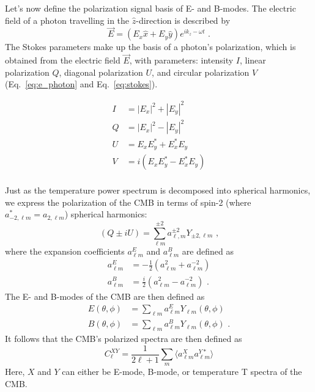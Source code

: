 Let's now define the polarization signal basis of E- and B-modes.  The electric field of a photon travelling in the $\hat{z}$-direction is described by
\begin{equation}
    \Vec{E} = (E_x\hat{x} + E_y\hat{y})e^{i k_z - \omega t } \text{ .}
    \label{eq:e_photon}
\end{equation}
The Stokes parameters make up the basis of a photon's polarization, which is obtained from the electric field $\Vec{E}$, with parameters: intensity $I$, linear polarization $Q$, diagonal polarization $U$, and circular polarization $V$ (Eq.~\ref{eq:e_photon} and Eq.~\ref{eq:stokes}).

\begin{equation}
\begin{split}
    I & = |E_x|^2 + |E_y|^2 \\
    Q & = |E_x|^2 - |E_y|^2 \\
    U & = E_x E_y^* + E_x^*E_y\\
    V & = i(E_x E_y^* - E_x^*E_y) \\
\end{split}
\label{eq:stokes}
\end{equation}

Just as the temperature power spectrum is decomposed into spherical harmonics, we express the polarization of the CMB in terms of spin-2 (where $a^*_{-2,\ell m} = a_{2,\ell m}$) spherical harmonics:
\begin{equation}
(Q \pm iU) = \sum_{\ell m}^{\pm 2} a^{\pm 2}_{\ell ,m} Y_{\pm2,\ell m} \text{ ,}
\end{equation}
where the expansion coefficients $a_{\ell m }^E$ and $a_{\ell m }^B$ are defined as
\begin{equation}
\begin{split}
    a_{\ell m }^E & = -\frac{1}{2}(a_{\ell m}^2 + a_{\ell m}^{-2}) \\
    a_{\ell m }^B & = \frac{i}{2}(a_{\ell m}^2 - a_{\ell m}^{-2}) \text{ .}
\end{split}
\end{equation}
The E- and B-modes of the CMB are then defined as
\begin{equation}
\begin{split}
    E(\theta,\phi) & = \sum_{\ell m} a_{\ell m }^E Y_{\ell m}(\theta,\phi) \\
    B(\theta,\phi) & = \sum_{\ell m} a_{\ell m }^B Y_{\ell m}(\theta,\phi) \text{ .}
\end{split}
\end{equation}
It follows that the CMB's polarized spectra are then defined as
\begin{equation}
    C_{\ell}^{XY} = \frac{1}{2\ell+1}\sum_m \langle a_{\ell m}^{X} a_{\ell m}^{Y*} \rangle 
\end{equation}
Here, $X$ and $Y$ can either be E-mode, B-mode, or temperature T spectra of the CMB.

